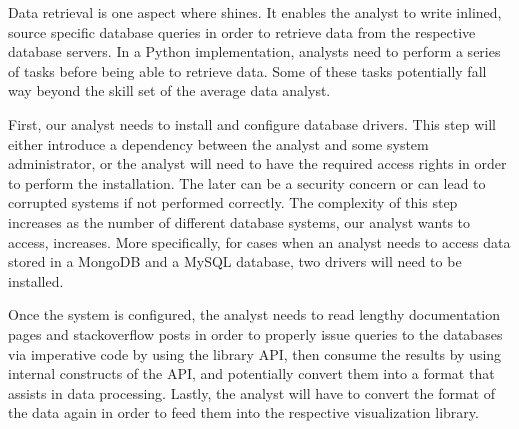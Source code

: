


Data retrieval is one aspect where {\projname} shines. It enables the analyst to write inlined, source specific database queries in order to retrieve data from the respective database servers. In a Python implementation, analysts need to perform a series of tasks before being able to retrieve data. Some of these tasks potentially fall way beyond the skill set of the average data analyst. 




First, our analyst needs to install and configure database drivers. This step will either introduce a dependency between the analyst and some system administrator, or the analyst will need to have the required access rights in order to perform the installation. The later can be a security concern or can lead to corrupted systems if not performed correctly. The complexity of this step increases as the number of different database systems, our analyst wants to access, increases. More specifically, for cases when an analyst needs to access data stored in a MongoDB and a MySQL database, two drivers will need to be installed.

Once the system is configured, the analyst needs to read lengthy documentation pages and stackoverflow posts in order to properly issue queries to the databases via imperative code by using the library API, then consume the results by using internal constructs of the API, and potentially convert them into a format that assists in data processing. Lastly, the analyst will have to convert the format of the data again in order to feed them into the respective visualization library.

